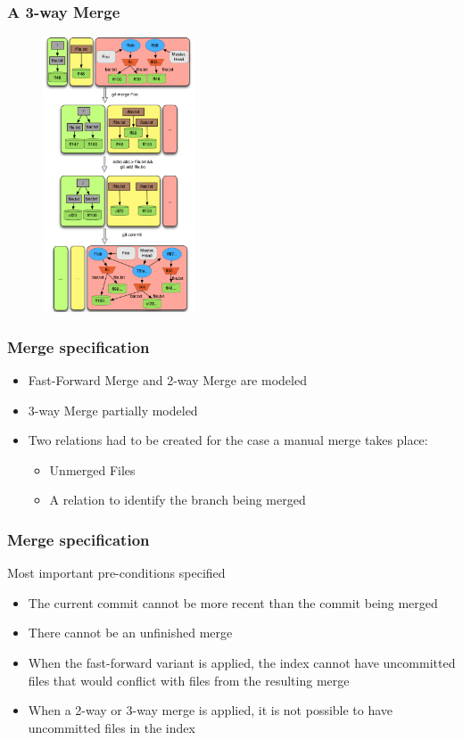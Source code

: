 \documentclass{beamer}
\begin{document}
\begin{frame}[fragile]
   \frametitle{A 3-way Merge}
   \begin{figure}
      \centering
      \includegraphics[width=0.4\textwidth]{images/merge2way.png}
   \end{figure}
\end{frame}

\begin{frame}[fragile]
	\frametitle{Merge specification}
   \normalsize
	\begin{itemize}
      \item Fast-Forward Merge and 2-way Merge are modeled
	   \item 3-way Merge partially modeled
	   \item Two relations had to be created for the case a manual
      merge takes place:
	   \begin{itemize}
		   \item Unmerged Files
		   \item A relation to identify the branch being merged
	   \end{itemize}
	\end{itemize}
\end{frame}

\begin{frame}[fragile]
	\frametitle{Merge specification}
	\begin{block}{Most important pre-conditions specified}
	\begin{itemize}
		\item The current commit cannot be more recent than the commit
		being merged
		\item There cannot be an unfinished merge
		\item When the fast-forward variant is applied, the index cannot have
		uncommitted files that would conflict with files from the 
		resulting merge
		\item When a 2-way or 3-way merge is applied, it is not possible
		to have uncommitted files in the index
	\end{itemize}
	\end{block}


\end{frame}
\end{document}
